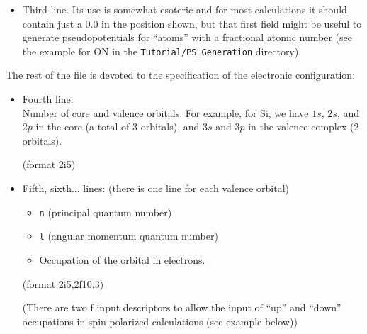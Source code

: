 \documentclass[11pt]{article}
\begin{document}
\begin{itemize}
\begin{itemize}
	\item The character {\tt r} next to {\tt ca} is a flag to perform the
          calculation relativistically, that is, solving the Dirac equation
          instead of the Schrodinger equation. 
	  The full range of options is:
	    \begin{itemize}
		\item {\tt s} : Spin-polarized calculation, non-relativistic.
		\item {\tt r}: Relativistic calculation, obviously polarized.
		\item (blank) : Non-polarized (spin ignored), non-relativistic
           		calculation.
	    \end{itemize}
	\end{itemize}
	
	(format 3x,a2,3x,a2,a1,2x)

\item Third line. Its use is somewhat esoteric and for most
  calculations it should contain just a 0.0 in the position shown, but
  that first field might be useful to generate pseudopotentials for
  ``atoms'' with a fractional atomic number (see the example for ON in
  the {\tt Tutorial/PS\_Generation} directory).
\end{itemize}

The rest of the file is devoted to the specification of the electronic
configuration:

\begin{itemize} 

\item Fourth line:\\
	 Number of core and valence orbitals. For example, for Si, we
	have $1s$, $2s$, and $2p$ in the core (a total of 3 orbitals), and
	$3s$ and $3p$ in the valence complex (2 orbitals).

	(format 2i5)

\item Fifth, sixth... lines: (there is one line for each valence
orbital)
	\begin{itemize}
	\item {\tt n} (principal quantum number)
	\item {\tt l} (angular momentum quantum number)
	\item Occupation of the orbital in electrons. 
	\end{itemize}

	(format 2i5,2f10.3)

	(There are two f input descriptors to allow the input of ``up''
	and ``down'' occupations in spin-polarized calculations (see
	example below))

\end{itemize}
\end{document}
